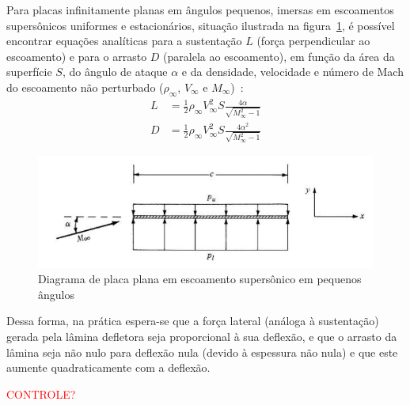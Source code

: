 Para placas infinitamente planas em ângulos pequenos, imersas em escoamentos supersônicos uniformes e estacionários, situação ilustrada na figura~\ref{fig:supersonic_flat_plate}, é possível encontrar equações analíticas para a sustentação \(L\) (força perpendicular ao escoamento) e para o arrasto \(D\) (paralela ao escoamento), em função da área da superfície \(S\), do ângulo de ataque \(\alpha \) e da densidade, velocidade e número de Mach do escoamento não perturbado (\(\rho_\infty \), \(V_\infty \) e \(M_\infty \))~\cite{anderson}:
\begin{align}
    L &= \frac{1}{2} \rho_\infty V_\infty^2 S \frac{4\alpha}{\sqrt{M_\infty^2-1}} \\
    D &= \frac{1}{2} \rho_\infty V_\infty^2 S \frac{4\alpha^2}{\sqrt{M_\infty^2-1}}
\end{align}

\begin{figure}[htbp]
    \centering
    \includegraphics[width=\textwidth]{img/supersonic_flat_plate.png}
    \caption{Diagrama de placa plana em escoamento supersônico em pequenos ângulos}\label{fig:supersonic_flat_plate}
\end{figure}

Dessa forma, na prática espera-se que a força lateral (análoga à sustentação) gerada pela lâmina defletora seja proporcional à sua deflexão, e que o arrasto da lâmina seja não nulo para deflexão nula (devido à espessura não nula) e que este aumente quadraticamente com a deflexão.

\textcolor{red}{CONTROLE?}
